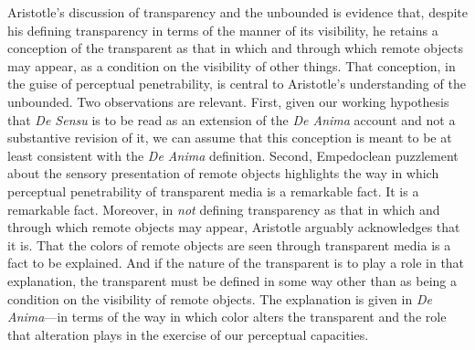 Aristotle's discussion of transparency and the unbounded is evidence that, despite his defining transparency in terms of the manner of its visibility, he retains a conception of the transparent as that in which and through which remote objects may appear, as a condition on the visibility of other things. That conception, in the guise of perceptual penetrability, is central to Aristotle's understanding of the unbounded. Two observations are relevant. First, given our working hypothesis that \emph{De Sensu} is to be read as an extension of the \emph{De Anima} account and not a substantive revision of it, we can assume that this conception is meant to be at least consistent with the \emph{De Anima} definition.  Second, Empedoclean puzzlement about the sensory presentation of remote objects highlights the way in which perceptual penetrability of transparent media is a remarkable fact. It is a remarkable fact. Moreover, in \emph{not} defining transparency as that in which and through which remote objects may appear, Aristotle arguably acknowledges that it is. That the colors of remote objects are seen through transparent media is a fact to be explained. And if the nature of the transparent is to play a role in that explanation, the transparent must be defined in some way other than as being a condition on the visibility of remote objects. The explanation is given in \emph{De Anima}---in terms of the way in which color alters the transparent and the role that alteration plays in the exercise of our perceptual capacities. 


